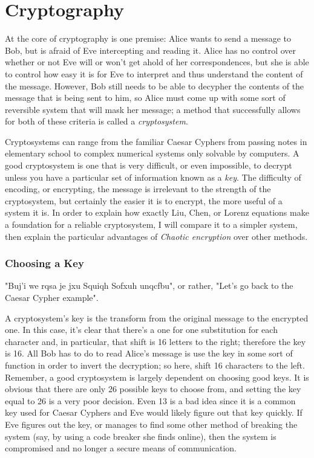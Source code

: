 \chapter{Cryptography}

At the core of cryptography is one premise:  Alice wants to send a message to Bob, but is afraid of Eve intercepting and reading it.  Alice has no control over whether or not Eve will or won't get ahold of her correspondences, but she is able to control how easy it is for Eve to interpret and thus understand the content of the message.  However, Bob still needs to be able to decypher the contents of the message that is being sent to him, so Alice must come up with some sort of reversible system that will mask her message; a method that successfully allows for both of these criteria is called a \textit{cryptosystem}.

Cryptosystems can range from the familiar Caesar Cyphers from passing notes in elementary school to complex numerical systems only solvable by computers.  A good cryptosystem is one that is very difficult, or even impossible, to decrypt unless you have a particular set of information known as a \textit{key}.  The difficulty of encoding, or encrypting, the message is irrelevant to the strength of the cryptosystem, but certainly the easier it is to encrypt, the more useful of a system it is.  In order to explain how exactly  Liu, Chen, or Lorenz equations make a foundation for a reliable cryptosystem, I will compare it to a simpler system, then explain the particular advantages of \textit{Chaotic encryption} over other methods.

\subsection{Choosing a Key}

"Buj'i we rqsa je jxu Squiqh Sofxuh unqcfbu", or rather, "Let's go back to the Caesar Cypher example". 

A cryptosystem's key is the transform from the original message to the encrypted one.  In this case, it's clear that there's a one for one substitution for each character and, in particular, that shift is 16 letters to the right; therefore the key is 16. All Bob has to do to read Alice's message is use the key in some sort of function in order to invert the decryption; so here, shift 16 characters to the left.  Remember, a good cryptosystem is largely dependent on choosing good keys.  It is obvious that there are only 26 possible keys to choose from, and setting the key equal to 26 is a very poor decision.  Even 13 is a bad idea since it is a common key used for Caesar Cyphers and Eve would likely figure out that key quickly.  If Eve figures out the key, or manages to find some other method of breaking the system (say, by using a code breaker she finds online), then the system is compromised and no longer a secure means of communication.

